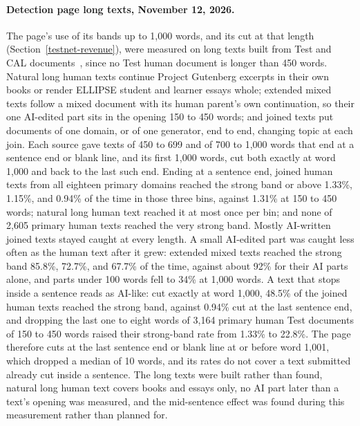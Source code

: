 \paragraph{Detection page long texts, November 12, 2026.}\label{long-text-evidence}
The page's use of its bands up to 1,000 words, and its cut at that length
(Section~\ref{testnet-revenue}), were measured on long texts built from Test
and CAL documents~\cite{detectevidence}, since no Test human document is longer
than 450 words. Natural long human texts continue Project Gutenberg excerpts in
their own books or render ELLIPSE student and learner essays whole; extended
mixed texts follow a mixed document with its human parent's own continuation,
so their one AI-edited part sits in the opening 150 to 450 words; and joined
texts put documents of one domain, or of one generator, end to end, changing
topic at each join. Each source gave texts of 450 to 699 and of 700 to 1,000
words that end at a sentence end or blank line, and its first 1,000 words, cut
both exactly at word 1,000 and back to the last such end. Ending at a sentence
end, joined human texts from all eighteen primary domains reached the strong
band or above 1.33\%, 1.15\%, and 0.94\% of the time in those three bins,
against 1.31\% at 150 to 450 words; natural long human text reached it at most
once per bin; and none of 2,605 primary human texts reached the very strong
band. Mostly AI-written joined texts stayed caught at every length. A small
AI-edited part was caught less often as the human text after it grew: extended
mixed texts reached the strong band 85.8\%, 72.7\%, and 67.7\% of the time,
against about 92\% for their AI parts alone, and parts under 100 words fell to
34\% at 1,000 words. A text that stops inside a sentence reads as AI-like: cut
exactly at word 1,000, 48.5\% of the joined human texts reached the strong
band, against 0.94\% cut at the last sentence end, and dropping the last one to
eight words of 3,164 primary human Test documents of 150 to 450 words raised
their strong-band rate from 1.33\% to 22.8\%. The page therefore cuts at the
last sentence end or blank line at or before word 1,001, which dropped a median
of 10 words, and its rates do not cover a text submitted already cut inside a
sentence. The long texts were built rather than found, natural long human text
covers books and essays only, no AI part later than a text's opening was
measured, and the mid-sentence effect was found during this measurement rather
than planned for.


